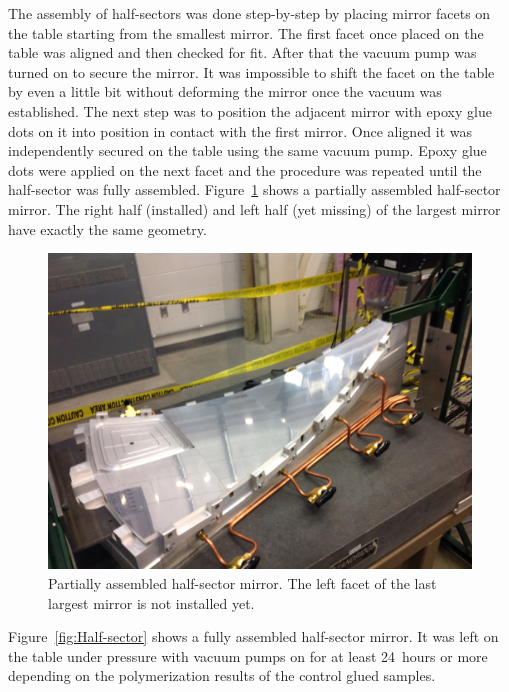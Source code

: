The assembly of half-sectors was done step-by-step by placing mirror facets on the table starting from the
smallest mirror. The first facet once placed on the table was aligned and then checked for fit. After that the
vacuum pump was turned on to secure the mirror. It was impossible to shift the facet on the table by even a
little bit without deforming the mirror once the vacuum was established. The next step was to position the
adjacent mirror with epoxy glue dots on it into position in contact with the first mirror. Once aligned it was
independently secured on the table using the same vacuum pump. Epoxy glue dots were applied on the next
facet and the procedure was repeated until the half-sector was fully assembled.
Figure~\ref{fig:Partial_Half-sector} shows a partially assembled half-sector mirror. The right half (installed)
and left half (yet missing) of the largest mirror have exactly the same geometry.

\begin{figure}[ht]
    \centering
    \includegraphics[width=1.0\linewidth]{images/Partial_Half-sector.png}
    \caption{Partially assembled half-sector mirror. The left facet of the last largest mirror is not installed yet.}
    \label{fig:Partial_Half-sector}
\end{figure} 

Figure~\ref{fig:Half-sector} shows a fully assembled half-sector mirror. It was left on the table under pressure
with vacuum pumps on for at least 24~hours or more depending on the polymerization results of the control glued
samples. 

